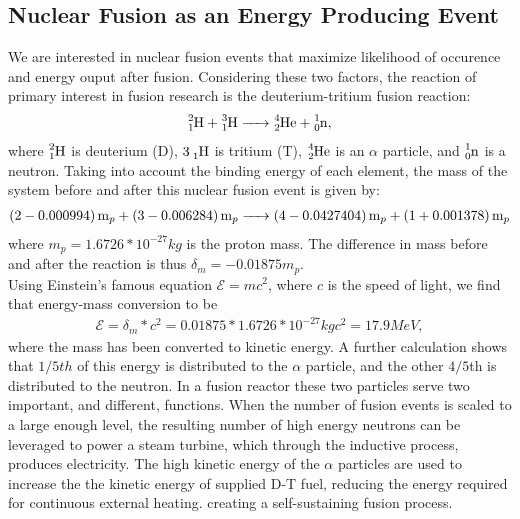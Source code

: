 \documentclass{article}
\begin{document}
\subsection{Nuclear Fusion as an Energy Producing Event}
We are interested in nuclear fusion events that maximize likelihood of occurence and energy ouput after fusion. Considering these two factors, the reaction of primary interest in fusion research is the deuterium-tritium fusion reaction:  
\begin{align*}
\ce{^2_1H + ^3_1H ->	^4_2He + ^1_0n}, 
\end{align*}	
where $\ce{^2_1H}$ is deuterium (D), $\ce{3_1H}$ is tritium (T),  $\ce{^4_2He}$ is an $\alpha$ particle, and $\ce{^1_0n}$ is a neutron.
Taking into account the binding energy of each element, the mass of the system before and after this nuclear fusion event is given by:
\begin{align*}
\ce{(2 - 0.000994)m_p +(3 - 0.006284) m_p -> (4 - 0.0427404)m_p + (1 + 0.001378)m_p}
\end{align*}
where $m_p=1.6726*10^{-27}kg$ is the proton mass. The difference in mass before and after the reaction is thus $\delta_m = -0.01875m_p$.\\
Using Einstein's famous equation $\mathcal{E} = mc^2$, where $c$ is the speed of light, we find that energy-mass conversion to be
\begin{align*}
\mathcal{E} = \delta_m *c^2 = 0.01875*1.6726*10^{-27}kg c^2 = 17.9 MeV,
\end{align*}
where the mass has been converted to kinetic energy.
A further calculation shows that $1/5th$ of this energy is distributed to the $\alpha$ particle, and the other $4/5$th is distributed to the neutron. In a fusion reactor these two particles serve two important, and different, functions. When the number of fusion events is scaled to a large enough level, the resulting number of high energy neutrons can be leveraged to power a steam turbine, which through the inductive process, produces electricity. The high kinetic energy of the $\alpha$ particles are used to increase the the kinetic energy of supplied D-T fuel, reducing the energy required for continuous external heating. creating a self-sustaining fusion process. \\
\end{document}
